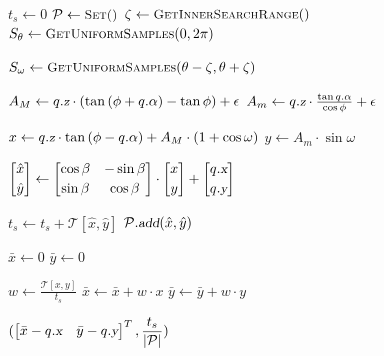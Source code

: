 \documentclass[12pt]{article}
\newcommand{\Function}[1]{\ensuremath{{\small \textsc{#1}}}}
\newcommand{\Var}[1]{\ensuremath{{\small{\textsl{#1}}}}}
\begin{document}
\begin{algorithm}[ht]

\caption{$\Function{GetDirection}(q, \beta, \phi, \mathcal{T})$}

\label{algo:2dplanning}

\begin{algorithmic}[1]

\setcounter{ALC@line}{0}

\vspace*{1mm}


\STATE $t_{s} \leftarrow 0$
\STATE $\mathcal{P} \leftarrow \Function{Set()}$
\STATE $\zeta \leftarrow \Function{GetInnerSearchRange}()$
\STATE $S_{\theta} \leftarrow \Function{GetUniformSamples}(0, 2 \pi)$


\STATE $S_{\omega} \leftarrow \Function{GetUniformSamples}(\theta - \zeta, \theta + \zeta)$


\STATE $A_{M} \leftarrow q.\Var{z} \cdot (\tan{(\phi + q.\alpha)} - \tan{\phi}) + \epsilon$
\STATE $A_{m} \leftarrow q.\Var{z} \cdot \frac{\tan{q.\alpha}}{\cos{\phi}} + \epsilon$

\STATE $x \leftarrow q.\Var{z} \cdot \tan{(\phi - q.\alpha)} + A_{M} \cdot (1 + \cos{\omega})$
\STATE $y \leftarrow A_{m} \cdot \sin{\omega}$

\STATE $\begin{bmatrix}
    \hat{x} \\[0.2em]
    \hat{y}
\end{bmatrix} \leftarrow \begin{bmatrix}
    \cos{\beta} & -\sin{\beta} \\[0.2em]
    \sin{\beta} & \cos{\beta}
\end{bmatrix} \cdot \begin{bmatrix}
    x \\[0.2em]
    y
\end{bmatrix} + \begin{bmatrix}
    q.\Var{x} \\[0.2em]
    q.\Var{y}
\end{bmatrix}$

\STATE $t_{s} \leftarrow t_{s} + \mathcal{T}[\hat{x}, \hat{y}]$
\STATE $\mathcal{P}.\Var{add}(\hat{x}, \hat{y})$

\ENDFOR

\ENDFOR

\STATE $\bar{x} \leftarrow 0$
\STATE $\bar{y} \leftarrow 0$


\STATE $w \leftarrow \frac{\mathcal{T}[x, y]}{t_{s}}$
\STATE $\bar{x} \leftarrow \bar{x} + w \cdot x$
\STATE $\bar{y} \leftarrow \bar{y} + w \cdot y$

\ENDFOR

\RETURN $(\begin{bmatrix}
    \bar{x} - q.\Var{x} & \bar{y} - q.\Var{y}
\end{bmatrix} ^ T, \mathlarger{\frac{t_s}{|\mathcal{P}|}})$

\end{algorithmic}
\end{algorithm}
\end{document}
